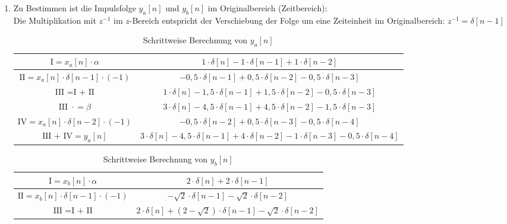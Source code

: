 \begin{enumerate}[label=\alph*)]
	\lstset{language=matlab}
	\item Zu Bestimmen ist die Impulsfolge $y_a[n]$ und $y_b[n]$ im Originalbereich (Zeitbereich): \\[1.5ex]
	Die Multiplikation mit $z^{-1}$ im $z$-Bereich entspricht der Verschiebung der Folge um eine Zeiteinheit im Originalbereich: $z^{-1} =\delta[n-1]$
	\vspace{-8pt}
	\begin{table}[H]
		\centering
		\caption{Schrittweise Berechnung von $y_a[n]$}
		\begin{tabular}{|c|c|}
			\hline
			\ccgray $\mathrm{I} =x_a[n] \cdot \alpha$					& $ 1 \cdot \delta[n] - 1 \cdot \delta[n-1] + 1 \cdot \delta[n-2]$ \\
			\hline
			\ccgray $\mathrm{II} =x_a[n] \cdot \delta[n-1] \cdot{(-1)}$	& $-0,5 \cdot \delta[n-1] + 0,5 \cdot \delta[n-2] - 0,5 \cdot \delta[n-3]$ \\
			\hline
			\ccgray $\textrm{III =I + II}$								& $1 \cdot \delta[n] - 1,5 \cdot \delta[n-1] + 1,5 \cdot \delta[n-2] - 0,5 \cdot \delta[n-3]$ \\
			\hline
			\ccgray $\mathrm{III} \;\cdot\! =\beta$							& $3 \cdot \delta[n] - 4,5 \cdot \delta[n-1] + 4,5 \cdot \delta[n-2] - 1,5 \cdot \delta[n-3]$ \\
			\hline
			\ccgray $\mathrm{IV} =x_a[n] \cdot \delta[n-2] \cdot{(-1)}$	& $- 0,5 \cdot \delta[n-2] + 0,5 \cdot \delta[n-3] - 0,5 \cdot \delta[n-4]$ \\
			\hline
			\ccgray $\textrm{III + IV} =y_a[n]$							&  $3 \cdot \delta[n] - 4,5 \cdot \delta[n-1] + 4 \cdot \delta[n-2] -1 \cdot \delta[n-3] - 0,5 \cdot \delta[n-4]$ \\
			\hline
		\end{tabular}
	\end{table}
	\vspace{-8pt}
	\begin{table}[H]
		\centering
		\caption{Schrittweise Berechnung von $y_b[n]$}
		\begin{tabular}{|c|c|}
			\hline
			\ccgray $\mathrm{I} =x_b[n] \cdot \alpha$					& $2 \cdot \delta[n] + 2 \cdot \delta[n-1]$ \\
			\hline
			\ccgray $\mathrm{II} =x_b[n] \cdot \delta[n-1] \cdot{(-1)}$	& $-\sqrt{2} \cdot \delta[n-1] - \sqrt{2} \cdot \delta[n-2]$ \\
			\hline
			\ccgray $\textrm{III =I + II}$								& $2 \cdot \delta[n] + \left(2-\sqrt{2}\right)\cdot \delta[n-1] - \sqrt{2} \cdot \delta[n-2]$ \\

\end{tabular}
\end{table}
\end{enumerate}

